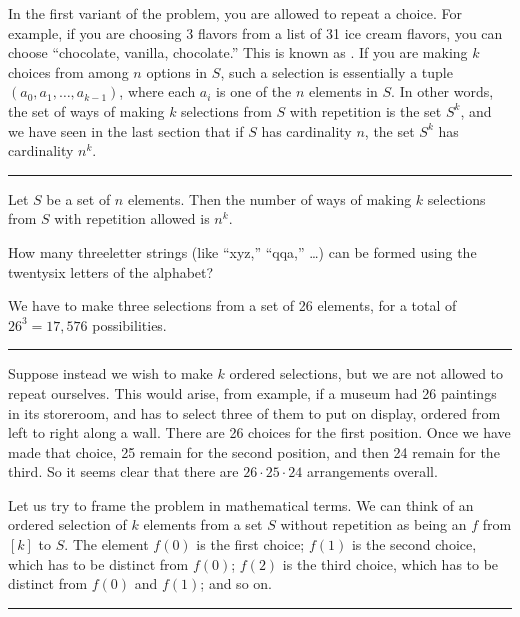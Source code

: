 \documentclass[letterpaper,10pt,english]{sphinxmanual}
\begin{document}
\sphinxAtStartPar
In the first variant of the problem, you are allowed to repeat a choice. For example, if you are choosing 3 flavors from a list of 31 ice cream flavors, you can choose “chocolate, vanilla, chocolate.” This is known as . If you are making \(k\) choices from among \(n\) options in \(S\), such a selection is essentially a tuple \((a_0, a_1, \ldots, a_{k-1})\), where each \(a_i\) is one of the \(n\) elements in \(S\). In other words, the set of ways of making \(k\) selections from \(S\) with repetition is the set \(S^k\), and we have seen in the last section that if \(S\) has cardinality \(n\), the set \(S^k\) has cardinality \(n^k\).


\bigskip\hrule\bigskip


\sphinxAtStartPar
{} Let \(S\) be a set of \(n\) elements. Then the number of ways of making \(k\) selections from \(S\) with repetition allowed is \(n^k\).

\sphinxAtStartPar
{} How many three\sphinxhyphen{}letter strings (like “xyz,” “qqa,” …) can be formed using the twenty\sphinxhyphen{}six letters of the alphabet?

\sphinxAtStartPar
{} We have to make three selections from a set of 26 elements, for a total of \(26^3 = 17,576\) possibilities.


\bigskip\hrule\bigskip


\sphinxAtStartPar
Suppose instead we wish to make \(k\) ordered selections, but we are not allowed to repeat ourselves. This would arise, from example, if a museum had 26 paintings in its storeroom, and has to select three of them to put on display, ordered from left to right along a wall. There are 26 choices for the first position. Once we have made that choice, 25 remain for the second position, and then 24 remain for the third. So it seems clear that there are \(26 \cdot 25 \cdot 24\) arrangements overall.

\sphinxAtStartPar
Let us try to frame the problem in mathematical terms. We can think of an ordered selection of \(k\) elements from a set \(S\) without repetition as being an  \(f\) from \([k]\) to \(S\). The element \(f(0)\) is the first choice; \(f(1)\) is the second choice, which has to be distinct from \(f(0)\); \(f(2)\) is the third choice, which has to be distinct from \(f(0)\) and \(f(1)\); and so on.


\bigskip\hrule\bigskip
\end{document}
